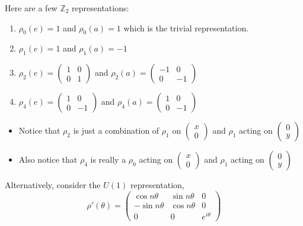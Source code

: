 Here are a few $\mathbb{Z}_2$ representations:
\begin{enumerate}
    \item $\rho_0(e) = 1$ and $\rho_0(a) = 1$ which is the trivial representation. 
    \item $\rho_1(e) = 1$ and $\rho_1(a) = -1$
    \item $\rho_2(e) = \begin{pmatrix}
        1 & 0 \\
        0 & 1
    \end{pmatrix}$ and $\rho_2(a) = \begin{pmatrix}
        -1 & 0 \\
        0 & -1
    \end{pmatrix}$
    \item $\rho_4(e) = \begin{pmatrix}
        1 & 0 \\
        0 & -1
    \end{pmatrix}$ and $\rho_4(a) = \begin{pmatrix}
        1 & 0 \\
        0 & -1
    \end{pmatrix}$
\end{enumerate}
\begin{itemize}
    \item Notice that $\rho_2$ is just a combination of $\rho_1$ on $\begin{pmatrix}x\\0\end{pmatrix}$ and $\rho_1$ acting on $\begin{pmatrix}0\\y\end{pmatrix}$
    \item Also notice that $\rho_4$ is really a $\rho_0$ acting on $\begin{pmatrix}x\\0\end{pmatrix}$ and $\rho_1$ acting on $\begin{pmatrix}0\\y\end{pmatrix}$
\end{itemize}
Alternatively, consider the $U(1)$ representation, 
\begin{equation}
    \rho'(\theta) = \begin{pmatrix}
        \cos n\theta &\sin n\theta & 0\\
        -\sin n\theta & \cos n\theta & 0\\
        0 & 0 & e^{i\theta}
    \end{pmatrix}
\end{equation}
